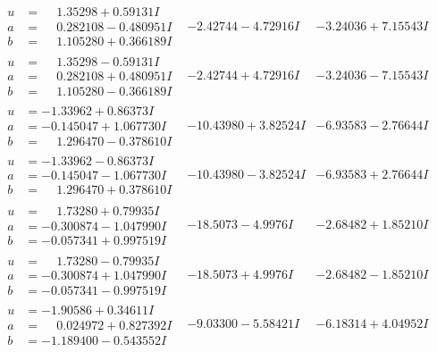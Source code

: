 \documentclass[1p]{elsarticle_modified}
\theoremstyle{definition}
\begin{document}
$$\begin{array}{c|c|c}
\begin{aligned}
u &= \phantom{-}1.35298 + 0.59131 I \\
a &= \phantom{-}0.282108 - 0.480951 I \\
b &= \phantom{-}1.105280 + 0.366189 I\end{aligned}
 & -2.42744 - 4.72916 I & -3.24036 + 7.15543 I \\ \hline\begin{aligned}
u &= \phantom{-}1.35298 - 0.59131 I \\
a &= \phantom{-}0.282108 + 0.480951 I \\
b &= \phantom{-}1.105280 - 0.366189 I\end{aligned}
 & -2.42744 + 4.72916 I & -3.24036 - 7.15543 I \\ \hline\begin{aligned}
u &= -1.33962 + 0.86373 I \\
a &= -0.145047 + 1.067730 I \\
b &= \phantom{-}1.296470 - 0.378610 I\end{aligned}
 & -10.43980 + 3.82524 I & -6.93583 - 2.76644 I \\ \hline\begin{aligned}
u &= -1.33962 - 0.86373 I \\
a &= -0.145047 - 1.067730 I \\
b &= \phantom{-}1.296470 + 0.378610 I\end{aligned}
 & -10.43980 - 3.82524 I & -6.93583 + 2.76644 I \\ \hline\begin{aligned}
u &= \phantom{-}1.73280 + 0.79935 I \\
a &= -0.300874 - 1.047990 I \\
b &= -0.057341 + 0.997519 I\end{aligned}
 & -18.5073 - 4.9976 I & -2.68482 + 1.85210 I \\ \hline\begin{aligned}
u &= \phantom{-}1.73280 - 0.79935 I \\
a &= -0.300874 + 1.047990 I \\
b &= -0.057341 - 0.997519 I\end{aligned}
 & -18.5073 + 4.9976 I & -2.68482 - 1.85210 I \\ \hline\begin{aligned}
u &= -1.90586 + 0.34611 I \\
a &= \phantom{-}0.024972 + 0.827392 I \\
b &= -1.189400 - 0.543552 I\end{aligned}
 & -9.03300 - 5.58421 I & -6.18314 + 4.04952 I \\ \hline\begin{aligned}

\end{aligned}
\end{array}$$
\end{document}
